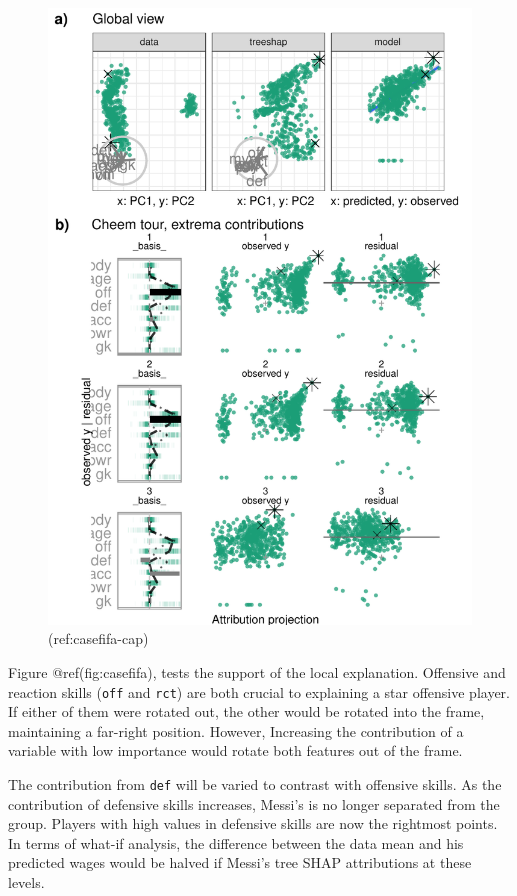 \documentclass[
]{article}
\begin{document}
\begin{figure}

{\centering \includegraphics[width=1\linewidth]{./figures/case_fifa} 

}

\caption{(ref:casefifa-cap)}\label{fig:casefifa}
\end{figure}

Figure @ref(fig:casefifa), tests the support of the local explanation.
Offensive and reaction skills (\texttt{off} and \texttt{rct}) are both
crucial to explaining a star offensive player. If either of them were
rotated out, the other would be rotated into the frame, maintaining a
far-right position. However, Increasing the contribution of a variable
with low importance would rotate both features out of the frame.

The contribution from \texttt{def} will be varied to contrast with
offensive skills. As the contribution of defensive skills increases,
Messi's is no longer separated from the group. Players with high values
in defensive skills are now the rightmost points. In terms of what-if
analysis, the difference between the data mean and his predicted wages
would be halved if Messi's tree SHAP attributions at these levels.
\end{document}
